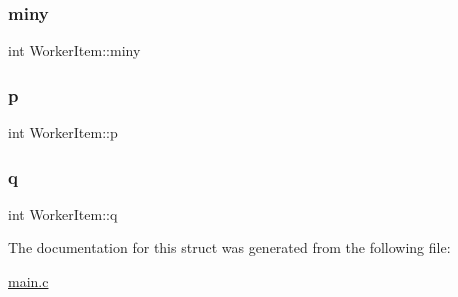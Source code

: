 \mbox{\label{structWorkerItem_a368c07bd7512c33c2af234b01feb2000}} 
\subsubsection{\texorpdfstring{miny}{miny}}
{\footnotesize\ttfamily int Worker\+Item\+::miny}

\mbox{\label{structWorkerItem_a56f8195e12033bf669e3543ac37035bf}} 
\subsubsection{\texorpdfstring{p}{p}}
{\footnotesize\ttfamily int Worker\+Item\+::p}

\mbox{\label{structWorkerItem_aca226a9caa91a2d8d8705681767607b2}} 
\subsubsection{\texorpdfstring{q}{q}}
{\footnotesize\ttfamily int Worker\+Item\+::q}



The documentation for this struct was generated from the following file\+:\begin{DoxyCompactItemize}
\item 
\hyperlink{main_8c}{main.\+c}\end{DoxyCompactItemize}
